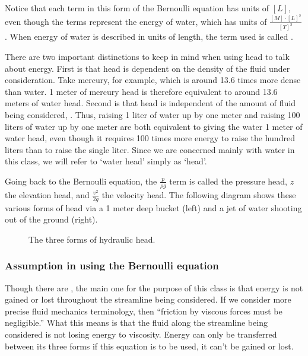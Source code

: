 \documentclass[letterpaper,10pt,english]{sphinxmanual}
\let\sphinxpxdimen\pdfpxdimen\else\newdimen\sphinxpxdimen
\begin{document}
Notice that each term in this form of the Bernoulli equation has units of \([L]\), even though the terms represent the energy of water, which has units of \(\frac{[M] \cdot [L]^2}{[T]^2}\). When energy of water is described in units of length, the term used is called .

There are two important distinctions to keep in mind when using head to talk about energy. First is that head is dependent on the density of the fluid under consideration. Take mercury, for example, which is around 13.6 times more dense than water. 1 meter of mercury head is therefore equivalent to around 13.6 meters of water head. Second is that head is independent of the amount of fluid being considered, . Thus, raising 1 liter of water up by one meter and raising 100 liters of water up by one meter are both equivalent to giving the water 1 meter of water head, even though it requires 100 times more energy to raise the hundred liters than to raise the single liter. Since we are concerned mainly with water in this class, we will refer to ‘water head’ simply as ‘head’.

Going back to the Bernoulli equation, the \(\frac{p}{\rho g}\) term is called the pressure head, \(z\) the elevation head, and \(\frac{v^2}{2g}\) the velocity head. The following diagram shows these various forms of head via a 1 meter deep bucket (left) and a jet of water shooting out of the ground (right).

\begin{figure}[htbp]
\centering
\capstart

\noindent\sphinxincludegraphics[width=650\sphinxpxdimen]{{different_forms_of_head}.png}
\caption{The three forms of hydraulic head.}\label{\detokenize{Fluids_Review/Fluids_Review_Design:id16}}\label{\detokenize{Fluids_Review/Fluids_Review_Design:different-forms-of-head}}\end{figure}


\subsubsection{Assumption in using the Bernoulli equation}
\label{\detokenize{Fluids_Review/Fluids_Review_Design:assumption-in-using-the-bernoulli-equation}}
Though there are , the main one for the purpose of this class is that energy is not gained or lost throughout the streamline being considered. If we consider more precise fluid mechanics terminology, then “friction by viscous forces must be negligible.” What this means is that the fluid along the streamline being considered is not losing energy to viscosity. Energy can only be transferred between its three forms if this equation is to be used, it can’t be gained or lost.
\end{document}
